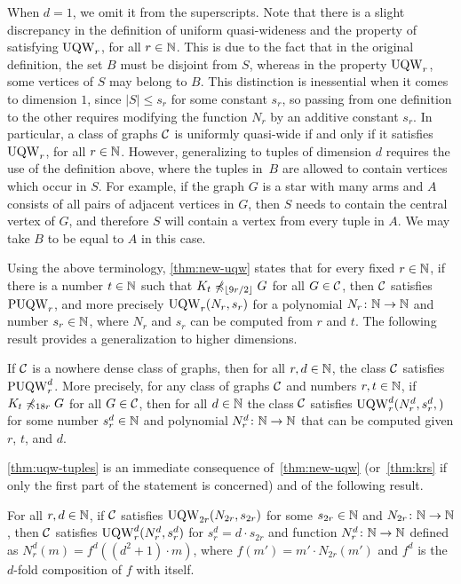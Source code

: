 When $d=1$, we omit it from the superscripts.
  Note that there is a slight discrepancy 
  in the definition of uniform quasi-wideness 
  and the property of satisfying $\uqw_r$, for all $r\in \N$.
  This is due to the fact that in the original definition,
  the set $B$ must be disjoint from $S$,
  whereas in the property $\uqw_r$, 
  some vertices of $S$ may belong to $B$. This distinction is inessential when it comes to dimension $1$, since $|S|\le s_r$ for some constant $s_r$,
  so passing from one definition to the other requires 
  modifying the function $N_r$ by an additive constant $s_r$.
In particular, a class of graphs $\cal C$ is uniformly quasi-wide if and only if it 
	satisfies $\uqw_r$, for all $r\in \N$.  
  However, generalizing to tuples of dimension $d$ requires the use of the definition above, where the tuples in~$B$ are allowed to contain  vertices which occur in $S$. 
  For example, if the graph $G$ is a star with many arms and $A$ consists of all pairs of adjacent vertices in $G$, then $S$
  needs to contain the central vertex of $G$,
  and therefore $S$ will contain a vertex from every tuple in $A$. We may take $B$ to be equal to $A$ in this case.
  
\medskip
	Using the above terminology, \cref{thm:new-uqw}
	states that for every fixed $r\in\N$, if there is a number $t\in\N$
	such that $K_t\not\minor_{\lfloor 9r/2\rfloor} G$ for all $G\in \cal C$,
	then $\cal C$ satisfies $\puqw_r$,
	and more precisely $\uqw_r(N_r,s_r)$
	for a polynomial $N_r\from\N\to\N$ and number $s_r\in \N$, where $N_r$ and $s_r$ can be computed from $r$ and $t$.
	The following result provides a generalization to higher dimensions.

\begin{theorem}\label{thm:uqw-tuples}If $\cal C$
	is a nowhere dense class of graphs,
	then for all $r,d\in\N$,
	the class $\cal C$ satisfies
	 $\puqw^d_r$.
	More precisely, for any class of graphs $\cal C$ and numbers $r,t\in\N$,
	if  	$K_t\not\minor_{18r} G$ for all $G\in \cal C$,
then for all $d\in \N$ the class $\cal C$ satisfies $\uqw^d_{r}(N^d_r,s^d_r,)$	for 
some number $s^d_r\in \N$ and polynomial $N^d_r\from \N\to\N$ that can be computed given $r$, $t$, and $d$.
\end{theorem}


\cref{thm:uqw-tuples} is an immediate consequence  of~\cref{thm:new-uqw} (or~\cref{thm:krs} if only the first part of the statement is concerned)
and of the following result.

\begin{proposition}\label{prop:uqw-tuples}
For all $r,d\in\N$,
if $\cal C$ satisfies $\uqw_{2r}(N_{2r},s_{2r})$ 
for some $s_{2r}\in\N$ and \mbox{$N_{2r}\colon\N\to \N$},
then $\cal C$
satisfies $\uqw^d_r(N^d_r,s^d_r)$
for  $s^d_r=d\cdot s_{2r}$ and 
function $N^d_r\colon \N\to \N$ defined as $N^d_r(m)=f^d((d^2+1)\cdot m)$, where $f(m')=m'\cdot N_{2r}(m')$ and $f^d$ is the $d$-fold composition of $f$ with itself.
\end{proposition}


